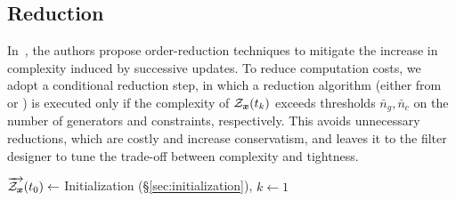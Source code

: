 \documentclass{ifacconf}
\begin{document}
\subsection{Reduction}\label{sec:czesmf_reduction}
\vspace{-0.2cm}
In~\cite{scott2016constrained}, the authors propose order-reduction techniques to mitigate the increase in complexity induced by successive updates. To reduce computation costs, we adopt a conditional reduction step, in which a reduction algorithm (either from \cite{scott2016constrained} or \cite{yang2018comparison}) is executed only if the complexity of $\mathcal{Z}_{\boldsymbol{x}} (t_k)$ exceeds thresholds $\bar{n}_g, \bar{n}_c$ on the number of generators and constraints, respectively. This avoids unnecessary reductions, which are costly and increase conservatism, and leaves it to the filter designer to tune the trade-off between complexity and tightness.



\setlength{\algomargin}{1em}
\begin{algorithm2e}[tb!]
\small
\DontPrintSemicolon%
$\overrightarrow{\mathcal{Z}_{\boldsymbol{x}}}(t_0)\gets$ Initialization (\S\ref{sec:initialization}), $k\gets 1$\;

  \caption{\small \czesmf}
  \label{alg:czesmf_resume}
\end{algorithm2e}
\end{document}
